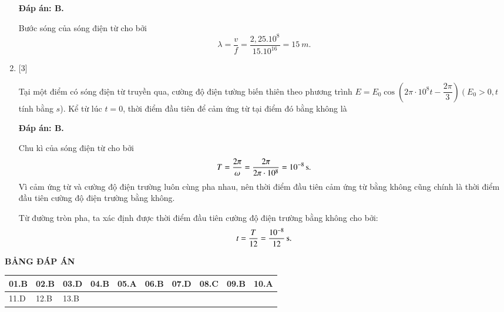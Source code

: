 \begin{enumerate}[label=\bfseries Câu \arabic*:]
	\hideall
	{		\textbf{Đáp án: B.}
		
Bước sóng của sóng điện từ cho bởi
$$
\lambda=\dfrac{v}{f}=\dfrac{2,25.10^{8}}{15.10^{16}}= \SI{15}{m}.
$$
		
	}

	\item {} [3]
	
	
	{Tại một điểm có sóng điện từ truyền qua, cường độ điện tường biến thiên theo phương trình $E=E_{0} \cos \left(2 \pi \cdot 10^{8} t-\dfrac{2 \pi}{3}\right)\left(E_{0}>0, t\right.$ tính bằng $s$). Kể từ lúc $t=0$, thời điểm đầu tiên để cảm ứng từ tại điểm đó bằng không là
	}
	
	\hideall
	{		\textbf{Đáp án: B.}
		
Chu kì của sóng điện từ cho bởi
$$
T=\dfrac{2 \pi}{\omega}=\dfrac{2 \pi}{2 \pi \cdot 10^{8}}= \xsi{10^{-8}}{s}.
$$
Vì cảm ứng từ và cường độ điện trường luôn cùng pha nhau, nên thời điểm đầu tiên cảm ứng từ bằng không cũng chính là thời điểm đầu tiên cường độ điện trường bằng không.

Từ đường tròn pha, ta xác định được thời điểm đầu tiên cường độ điện trường bằng không cho bởi:
$$
t=\dfrac{T}{12}= \xsi{\dfrac{10^{-8}}{12}}{s}.
$$
	}
	
\end{enumerate}

\hideall
{
	\begin{center}
		\textbf{BẢNG ĐÁP ÁN}
	\end{center}
	\begin{center}
		\begin{tabular}{|m{2.8em}|m{2.8em}|m{2.8em}|m{2.8em}|m{2.8em}|m{2.8em}|m{2.8em}|m{2.8em}|m{2.8em}|m{2.8em}|}
			\hline
			01.B  & 02.B  & 03.D  & 04.B  & 05.A  & 06.B  & 07.D & 08.C & 09.B & 10.A \\
			\hline
			11.D  & 12.B  & 13.B  &       &       &       &      &      &      & \\
			\hline
			
		\end{tabular}
	\end{center}
}

